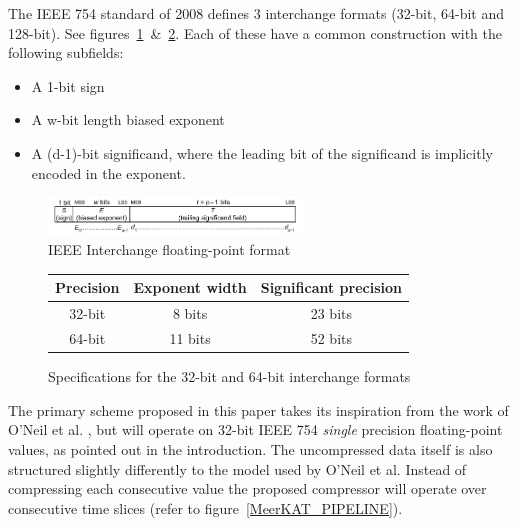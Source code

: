The IEEE 754 standard of 2008 defines 3 interchange formats (32-bit, 64-bit and 128-bit). See figures~\ref{IEEE_FLOAT}~\&~\ref{IEEE_FLOAT_TAB}. Each of these have a common 
construction with the following subfields:
\begin{itemize}
 \item A 1-bit sign
 \item A w-bit length biased exponent
 \item A (d-1)-bit significand, where the leading bit of the significand is implicitly encoded in the exponent.
\end{itemize}
\begin{figure}[h!]
 \centering
 \includegraphics[width=0.6\textwidth]{IEEEinterchangeFormat.png}
 \caption{IEEE Interchange floating-point format \cite{4610935}}
 \label{IEEE_FLOAT}
\end{figure}
\begin{figure}[h!]
\centering
\begin{tabular}{|c|c|c|}
 \hline
 Precision & Exponent width & Significant precision \\
 \hline
 32-bit & 8 bits & 23 bits \\
 \hline
 64-bit & 11 bits & 52 bits \\
 \hline
\end{tabular}
\caption{Specifications for the 32-bit and 64-bit interchange formats}
 \label{IEEE_FLOAT_TAB}
\end{figure}
The primary scheme proposed in this paper takes its inspiration from the work of O'Neil et al. \cite{O'Neil:2011:FDC:1964179.1964189}, but will operate on 32-bit 
IEEE 754 \textit{single} precision floating-point values, as pointed out in the introduction. The uncompressed data itself is also structured slightly 
differently to the model used by O'Neil et al. Instead of compressing each consecutive value the proposed compressor will operate 
over consecutive time slices (refer to figure~\ref{MeerKAT_PIPELINE}).

